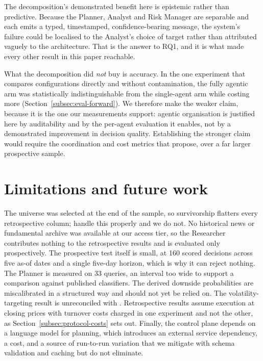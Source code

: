 \documentclass[pdflatex,sn-apa]{sn-jnl}%
\theoremstyle{thmstyleone}%
\theoremstyle{thmstyletwo}%
\theoremstyle{thmstylethree}%
\begin{document}
The decomposition's demonstrated benefit here is epistemic rather than
predictive. Because the Planner, Analyst and Risk Manager are separable and
each emits a typed, timestamped, confidence-bearing message, the system's
failure could be localised to the Analyst's choice of target rather than
attributed vaguely to the architecture. That is the answer to RQ1, and it is
what made every other result in this paper reachable.

What the decomposition did \emph{not} buy is accuracy. In the one experiment
that compares configurations directly and without contamination, the fully
agentic arm was statistically indistinguishable from the single-agent arm while
costing more (Section~\ref{subsec:eval-forward}). We therefore make the weaker claim,
because it is the one our measurements support: agentic organisation is
justified here by auditability and by the per-agent evaluation it enables, not
by a demonstrated improvement in decision quality. Establishing the stronger
claim would require the coordination and cost metrics that
\citet{nguyen2026reliable} propose, over a far larger prospective sample.

\section{Limitations and future work}\label{sec:limitations}

The universe was selected at the end of the sample, so survivorship flatters
every retrospective column; \citet{li2025finsaber} handle this properly and we
do not. No historical news or fundamental archive was available at our access
tier, so the Researcher contributes nothing to the retrospective results and is
evaluated only prospectively. The prospective test itself is small, at 160
scored decisions across five as-of dates and a single five-day horizon, which
is why it can reject nothing. The Planner is measured on 33 queries, an
interval too wide to support a comparison against published classifiers. The
derived downside probabilities are miscalibrated in a structured way and should
not yet be relied on. The volatility-targeting result is unreconciled with
\citet{moreira2017volatility}. Retrospective results assume execution at
closing prices with turnover costs charged in one experiment and not the other,
as Section~\ref{subsec:protocol-costs} sets out. Finally, the control plane
depends on a language model for planning, which introduces an external service
dependency, a cost, and a source of run-to-run variation that we mitigate with
schema validation and caching but do not eliminate.
\end{document}
